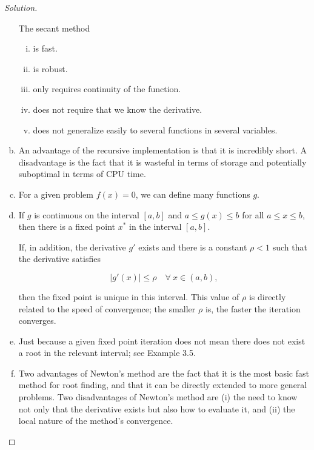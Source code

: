 \documentclass[12pt,a4]{article}
\theoremstyle{definition}
\begin{document}
\begin{proof}[Solution]
\begin{enumerate}[(a)]
		The secant method 
		\begin{enumerate}[(i)]
			\item is fast.
		
			\item is robust.
		
			\item only requires continuity of the function.
		
			\item does not require that we know the derivative.
		
			\item does not generalize easily to several functions in several variables.
		\end{enumerate}
		
		\item An advantage of the recursive implementation is that it is incredibly short. A disadvantage is the fact that it is wasteful in terms of storage and potentially suboptimal in terms of CPU time. 
		
		\item For a given problem $f(x) = 0$, we can define many functions $g$. 
		
		\item If $g$ is continuous on the interval $[a, b]$ and $a \leq g(x) \leq b$ for all $a \leq x \leq b$, then there is a fixed point $x^*$ in the interval $[a, b]$. 
		
		If, in addition, the derivative $g'$ exists and there is a constant $\rho < 1$ such that the derivative satisfies
		
		\[
		|g'(x)| \leq \rho \quad \forall \ x \in (a, b) {,}
		\]
		
		\noindent then the fixed point is unique in this interval. This value of $\rho$ is directly related to the speed of convergence; the smaller $\rho$ is, the faster the iteration converges. 
		
		\item Just because a given fixed point iteration does not mean there does not exist a root in the relevant interval; see Example 3.5. 
		
		\item Two advantages of Newton's method are the fact that it is the most basic fast method for root finding, and that it can be directly extended to more general problems. Two disadvantages of Newton's method are (i) the need to know not only that the derivative exists but also how to evaluate it, and (ii) the local nature of the method's convergence. 
		

\end{enumerate}
\end{proof}
\end{document}
